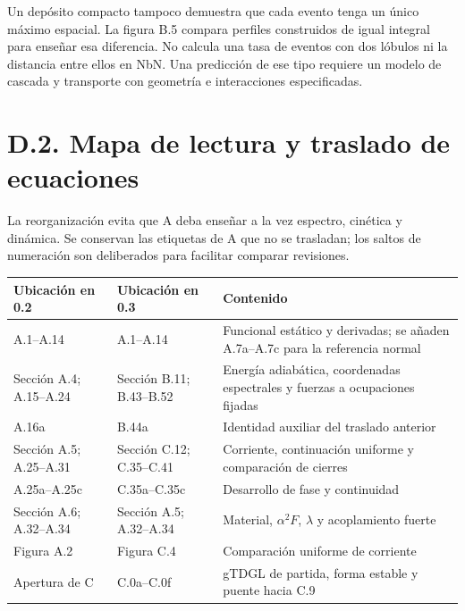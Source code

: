 \documentclass[
  spanish,
  10pt,
  a4paper,
]{article}
\newcounter{none} %
\begin{document}
Un depósito compacto tampoco demuestra que cada evento tenga un único
máximo espacial. La figura B.5 compara perfiles construidos de igual
integral para enseñar esa diferencia. No calcula una tasa de eventos con
dos lóbulos ni la distancia entre ellos en NbN. Una predicción de ese
tipo requiere un modelo de cascada y transporte con geometría e
interacciones especificadas.

\section{D.2. Mapa de lectura y traslado de
ecuaciones}\label{d.2.-mapa-de-lectura-y-traslado-de-ecuaciones}

La reorganización evita que A deba enseñar a la vez espectro, cinética y
dinámica. Se conservan las etiquetas de A que no se trasladan; los
saltos de numeración son deliberados para facilitar comparar revisiones.

{\def\LTcaptype{none} %
\begin{longtable}[]{@{}
  >{\raggedright\arraybackslash}p{}
  >{\raggedright\arraybackslash}p{}
  >{\raggedright\arraybackslash}p{}@{}}
\toprule\noalign{}
\begin{minipage}[b]{\linewidth}\raggedright
Ubicación en 0.2
\end{minipage} & \begin{minipage}[b]{\linewidth}\raggedright
Ubicación en 0.3
\end{minipage} & \begin{minipage}[b]{\linewidth}\raggedright
Contenido
\end{minipage} \\
\midrule\noalign{}
\endhead
\bottomrule\noalign{}
\endlastfoot
A.1--A.14 & A.1--A.14 & Funcional estático y derivadas; se añaden
A.7a--A.7c para la referencia normal \\
Sección A.4; A.15--A.24 & Sección B.11; B.43--B.52 & Energía adiabática,
coordenadas espectrales y fuerzas a ocupaciones fijadas \\
A.16a & B.44a & Identidad auxiliar del traslado anterior \\
Sección A.5; A.25--A.31 & Sección C.12; C.35--C.41 & Corriente,
continuación uniforme y comparación de cierres \\
A.25a--A.25c & C.35a--C.35c & Desarrollo de fase y continuidad \\
Sección A.6; A.32--A.34 & Sección A.5; A.32--A.34 & Material,
\(\alpha^2F\), \(\lambda\) y acoplamiento fuerte \\
Figura A.2 & Figura C.4 & Comparación uniforme de corriente \\
Apertura de C & C.0a--C.0f & gTDGL de partida, forma estable y puente
hacia C.9 \\
\end{longtable}
}
\end{document}
